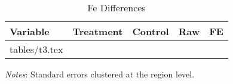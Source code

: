 \documentclass[a4paper]{article}
\makeatletter
\newcommand\primitiveinput[1]
{\@@input #1 }
\makeatother
\begin{document}
\begin{table}[H]
    \singlespacing
    \small
    \centering 
    \begin{adjustbox}{max width=\textwidth}
      \begin{threeparttable}
        \caption{Fe Differences}
        \label{tab:table3}
        \begin{tabular}[t]{@{}lcccc}
            \toprule
            Variable & Treatment & Control & Raw & FE  \\
            \midrule 
            \addlinespace
            \primitiveinput{tables/t3.tex}
            \bottomrule
        \end{tabular}
        \begin{tablenotes}
            \setlength{}
            \footnotesize
            \item \textit{Notes}: Standard errors clustered at the region level.
        \end{tablenotes}
      \end{threeparttable}
   \end{adjustbox}
 \end{table}

\end{document}
